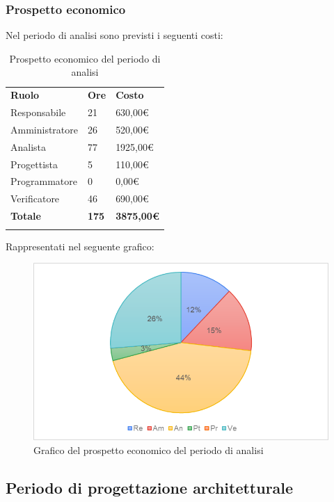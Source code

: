 		\subsubsection{Prospetto economico}
		Nel periodo di analisi sono previsti i seguenti costi:
		\begin{longtable} {
			>{}p{32mm}
			>{}p{20mm}
			>{}p{20mm}
		}
		\rowcolor{gray!50}
		
		\textbf{Ruolo} & \textbf{Ore} & \textbf{Costo} \TBstrut \\
		Responsabile & 21 & 630,00\euro{} \TBstrut \\
		Amministratore & 26 & 520,00\euro{} \TBstrut \\
		Analista & 77 & 1925,00\euro{} \TBstrut \\
		Progettista & 5 & 110,00\euro{} \TBstrut \\
		Programmatore & 0 & 0,00\euro{} \TBstrut \\
		Verificatore & 46 & 690,00\euro{} \TBstrut \\
		\textbf{Totale} & \textbf{175}& \textbf{3875,00\euro{}} \TBstrut \\
		\rowcolor{white}
		\caption{Prospetto economico del periodo di analisi}		
		\end{longtable}
		Rappresentati nel seguente grafico:
		\begin{figure} [H]
			\includegraphics[width=\linewidth]{./img/Grafici/2.png}
			\caption{Grafico del prospetto economico del periodo di analisi}
		\end{figure}
\subsection{Periodo di progettazione architetturale}
